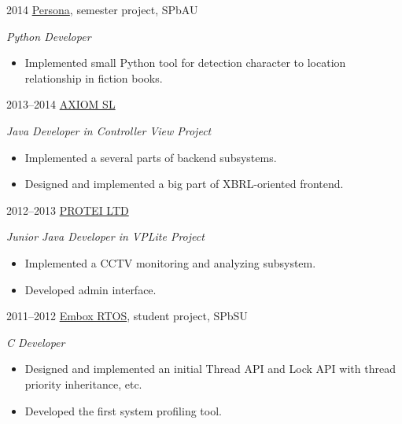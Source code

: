 \documentclass[]{friggeri-cv} %
\begin{document}
\begin{entrylist}
\entry
{2014}
{\href{https://github.com/nunberty/chars-movement-graph}{Persona}, semester project, SPbAU}
{}
{\emph{Python Developer}
    \begin{itemize}
        \item
        Implemented small Python tool for detection character to location relationship in fiction books.
    \end{itemize}
}
\entry
{2013--2014}
{\href{http://axiomsl.com}{AXIOM SL}}
{}
{\emph{Java Developer in Controller View Project}

    \begin{itemize}
    \item
        Implemented a several parts of backend subsystems.
    \item
        Designed and implemented
        a big part of XBRL-oriented frontend.
    \end{itemize}
}
\entry
{2012--2013}
{\href{http://protei.com}{PROTEI LTD}}
{}
{\emph{Junior Java Developer in VPLite Project}
    \begin{itemize}
        \item
        Implemented a CCTV monitoring and analyzing subsystem.
        \item
        Developed admin interface.
    \end{itemize}
}
\entry
{2011--2012}
{\href{https://code.google.com/p/embox}{Embox RTOS}, student project, SPbSU}
{}
{\emph{C Developer}
    \begin{itemize}
        \item
        Designed and implemented an initial Thread API and Lock API with thread priority inheritance, etc.
        \item
        Developed the first system profiling tool.
    \end{itemize}
}
\end{entrylist}

%
\end{document}
